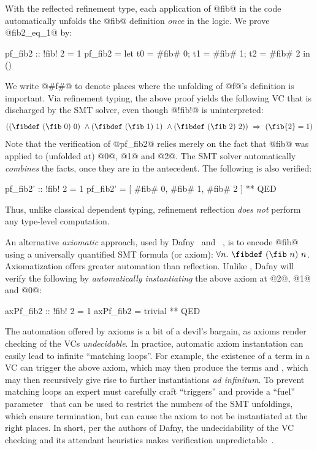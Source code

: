 %
With the reflected refinement type,
each application of @fib@ in the code
automatically unfolds the @fib@ definition
\textit{once} in the logic.
%
We prove @fib2_eq_1@ by:
%
\begin{code}
    pf_fib2 :: { !fib! 2 = 1 }
    pf_fib2 = let { t0 = #fib# 0; t1 = #fib# 1; t2 = #fib# 2 } in ()
\end{code}
%
We write @#f#@ to denote places where the
unfolding of @f@'s definition is important.
%
Via refinement typing, the above proof yields the
following VC that is discharged by the SMT solver,
even though @!fib!@ is uninterpreted:
%
$$((\fibdef\ (\fib\ 0)\ 0) \ \wedge (\fibdef\ (\fib\ 1)\ 1) \ \wedge (\fibdef\ (\fib\ 2)\ 2)) \  \Rightarrow\ (\fib{2} = 1)$$
%
%
Note that the verification of @pf_fib2@ relies
merely on the fact that @fib@ was applied
to (\ie unfolded at) @0@, @1@ and @2@.
%
The SMT solver automatically \emph{combines}
the facts, once they are in the antecedent.
The following is also verified:
%
\begin{code}
    pf_fib2' :: { !fib! 2 = 1 }
    pf_fib2' = [ #fib# 0, #fib# 1, #fib# 2 ] ** QED
\end{code}
%
%
Thus, unlike classical dependent typing, refinement
reflection \emph{does not} perform any type-level
computation.

%
An alternative \emph{axiomatic} approach,
used by Dafny~\citep{dafny} and
\fstar~\citep{fstar},
is to encode @fib@ using a universally
quantified SMT formula (or axiom):
$\forall n.\ \fibdef\ (\fib\ n)\ n$.
%
Axiomatization offers greater automation than
reflection. Unlike \toolname, Dafny
will verify the following by
\emph{automatically instantiating} the above
axiom at @2@, @1@ and @0@:
%
\begin{code}
    axPf_fib2 :: { !fib! 2 = 1 }
    axPf_fib2 = trivial ** QED
\end{code}
%
The automation offered by axioms is a bit of a
devil's bargain, as axioms render checking of
the VCs \emph{undecidable}.
%
In practice, automatic axiom instantation can
easily lead to infinite ``matching loops''.
%
For example, the existence of a term  in a VC
can trigger the above axiom, which may then produce
the terms  and , which may then
recursively give rise to further instantiations
\emph{ad infinitum}.
%
To prevent matching loops an expert must carefully
craft ``triggers'' and provide a ``fuel''
parameter~\citep{Amin2014ComputingWA} that can be
used to restrict the numbers of the SMT unfoldings,
which ensure termination, but can cause the axiom
to not be instantiated at the right places.
%
In short, per the authors of Dafny, the
undecidability of the VC checking and its
attendant heuristics makes verification
unpredictable~\citep{Leino16}.

